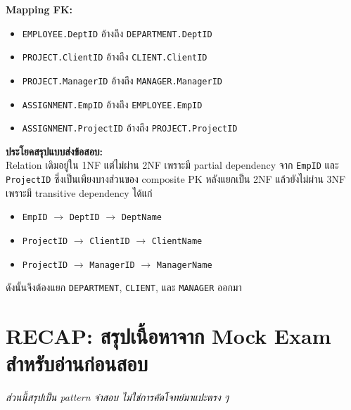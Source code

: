 \documentclass[a4paper,12pt]{article}
\newcommand{\schema}[1]{\texttt{#1}}
\begin{document}
\textbf{Mapping FK:}
\begin{itemize}
    \item \schema{EMPLOYEE.DeptID} อ้างถึง \schema{DEPARTMENT.DeptID}
    \item \schema{PROJECT.ClientID} อ้างถึง \schema{CLIENT.ClientID}
    \item \schema{PROJECT.ManagerID} อ้างถึง \schema{MANAGER.ManagerID}
    \item \schema{ASSIGNMENT.EmpID} อ้างถึง \schema{EMPLOYEE.EmpID}
    \item \schema{ASSIGNMENT.ProjectID} อ้างถึง \schema{PROJECT.ProjectID}
\end{itemize}

\textbf{ประโยคสรุปแบบส่งข้อสอบ:}\\
Relation เดิมอยู่ใน 1NF แต่ไม่ผ่าน 2NF เพราะมี partial dependency จาก \schema{EmpID} และ \schema{ProjectID} ซึ่งเป็นเพียงบางส่วนของ composite PK หลังแยกเป็น 2NF แล้วยังไม่ผ่าน 3NF เพราะมี transitive dependency ได้แก่
\begin{itemize}[leftmargin=1.5em]
    \item \schema{EmpID} $\rightarrow$ \schema{DeptID} $\rightarrow$ \schema{DeptName}
    \item \schema{ProjectID} $\rightarrow$ \schema{ClientID} $\rightarrow$ \schema{ClientName}
    \item \schema{ProjectID} $\rightarrow$ \schema{ManagerID} $\rightarrow$ \schema{ManagerName}
\end{itemize}
ดังนั้นจึงต้องแยก \schema{DEPARTMENT}, \schema{CLIENT}, และ \schema{MANAGER} ออกมา

\newpage
\section*{RECAP: สรุปเนื้อหาจาก Mock Exam สำหรับอ่านก่อนสอบ}
\textit{ส่วนนี้สรุปเป็น pattern จำสอบ ไม่ใช่การคัดโจทย์มาแปะตรง ๆ}
\end{document}
